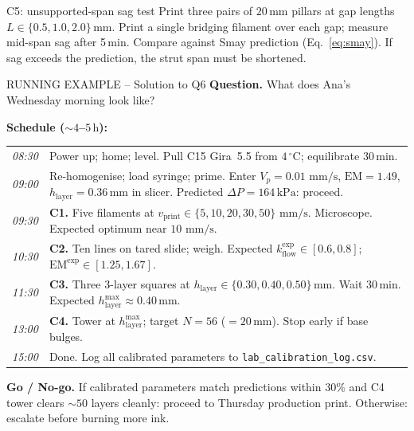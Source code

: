 \documentclass[11pt,a4paper]{article}
\newcommand{\mms}{\,\mathrm{mm/s}}
\begin{document}
\begin{stepbox}{C5: unsupported-span sag test}
Print three pairs of $20\,\si{\mm}$ pillars at gap lengths
$L\in\{0.5,1.0,2.0\}\,\si{\mm}$. Print a single bridging filament over
each gap; measure mid-span sag after 5\,\si{\minute}. Compare against
Smay prediction (Eq.~\ref{eq:smay}). If sag exceeds the prediction, the
strut span must be shortened.
\end{stepbox}

\begin{runningbox}{RUNNING EXAMPLE -- Solution to Q6}
\textbf{Question.} What does Ana's Wednesday morning look like?

\medskip\textbf{Schedule ($\sim 4$--$5\,\si{\hour}$):}

\medskip
\begin{tabular}{p{2.0cm} p{12.5cm}}
\toprule
\textsl{08:30} & Power up; home; level. Pull C15 Gira~5.5 from $4\,^\circ$C;
equilibrate 30\,\si{\minute}. \\
\textsl{09:00} & Re-homogenise; load syringe; prime. Enter $V_p=0.01\,\mms$,
$\mathrm{EM}=1.49$, $h_\mathrm{layer}=0.36\,\si{\mm}$ in slicer.
Predicted $\Delta P=164\,\si{\kPa}$: proceed. \\
\textsl{09:30} & \textbf{C1.} Five filaments at $v_\mathrm{print}\in
\{5,10,20,30,50\}\,\mms$. Microscope. Expected optimum near $10\,\mms$. \\
\textsl{10:30} & \textbf{C2.} Ten lines on tared slide; weigh.
Expected $k_\mathrm{flow}^\mathrm{exp}\in[0.6,0.8]$;
$\mathrm{EM}^\mathrm{exp}\in[1.25,1.67]$. \\
\textsl{11:30} & \textbf{C3.} Three 3-layer squares at
$h_\mathrm{layer}\in\{0.30,0.40,0.50\}\,\si{\mm}$. Wait 30\,\si{\minute}.
Expected $h_\mathrm{layer}^{\max}\approx 0.40\,\si{\mm}$. \\
\textsl{13:00} & \textbf{C4.} Tower at $h_\mathrm{layer}^{\max}$;
target $N=56$ ($=20\,\si{\mm}$). Stop early if base bulges. \\
\textsl{15:00} & Done. Log all calibrated parameters to
\texttt{lab\_calibration\_log.csv}. \\
\bottomrule
\end{tabular}

\medskip\textbf{Go / No-go.} If calibrated parameters match predictions
within 30\% and C4 tower clears $\sim 50$ layers cleanly: proceed to
Thursday production print. Otherwise: escalate before burning more ink.
\end{runningbox}

\end{document}
